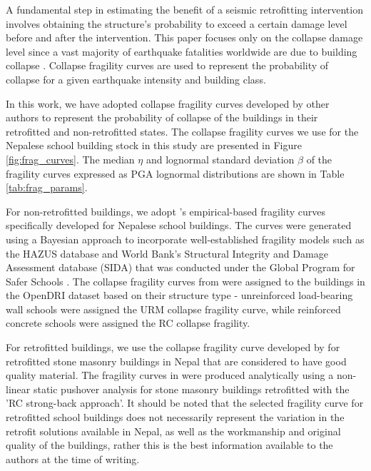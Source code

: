 \documentclass[utf8]{frontiersSCNS} %
\begin{document}
A fundamental step in estimating the benefit of a seismic retrofitting intervention involves obtaining the structure’s probability to exceed a certain damage level before and after the intervention. This paper focuses only on the collapse damage level since a vast majority of earthquake fatalities worldwide are due to building collapse \citep{spence2007saving}. Collapse fragility curves are used to represent the probability of collapse for a given earthquake intensity and building class. 

In this work, we have adopted collapse fragility curves developed by other authors to represent the probability of collapse of the buildings in their retrofitted and non-retrofitted states. The collapse fragility curves we use for the Nepalese school building stock in this study are presented in Figure \ref{fig:frag_curves}. The median $\eta$ and lognormal standard deviation $\beta$ of the fragility curves expressed as PGA lognormal distributions are shown in Table \ref{tab:frag_params}.

For non-retrofitted buildings, we adopt \cite{giordano2021empirical}'s empirical-based fragility curves specifically developed for Nepalese school buildings. The curves were generated using a Bayesian approach to incorporate well-established fragility models such as the HAZUS database \citep{mh20152} and World Bank's Structural Integrity and Damage Assessment database (SIDA) that was conducted under the Global Program for Safer Schools \citep{wbglosi}. The collapse fragility curves from \cite{giordano2021empirical} were assigned to the buildings in the OpenDRI dataset based on their structure type - unreinforced load-bearing wall schools were assigned the URM collapse fragility curve, while reinforced concrete schools were assigned the RC collapse fragility.


For retrofitted buildings, we use the collapse fragility curve developed by \cite{giordano2021financial} for retrofitted stone masonry buildings in Nepal that are considered to have good quality material. The fragility curves in \cite{giordano2021financial} were produced analytically using a non-linear static pushover analysis for stone masonry buildings retrofitted with the 'RC strong-back approach'. It should be noted that the selected fragility curve for retrofitted school buildings does not necessarily represent the variation in the retrofit solutions available in Nepal, as well as the workmanship and original quality of the buildings, rather this is the best information available to the authors at the time of writing.
\end{document}
